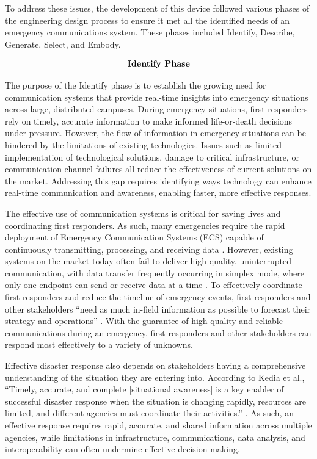 \documentclass[english,12pt,a4paper,titlepage]{article}
\begin{document}
	To address these issues, the development of this device followed various phases of the engineering design process to ensure it met all the identified needs of an emergency communications system. These phases included Identify, Describe, Generate, Select, and Embody.
	
	\[
	\begin{array}{cc}
		\mbox{\bfseries{Identify Phase}}
		\label{Identify Phase}
	\end{array}
	\]
	
	The purpose of the Identify phase is to establish the growing need for communication systems that provide real-time insights into emergency situations across large, distributed campuses. During emergency situations, first responders rely on timely, accurate information to make informed life‑or‑death decisions under pressure. However, the flow of information in emergency situations can be hindered by the limitations of existing technologies. Issues such as limited implementation of technological solutions, damage to critical infrastructure, or communication channel failures all reduce the effectiveness of current solutions on the market. Addressing this gap requires identifying ways technology can enhance real-time communication and awareness, enabling faster, more effective responses.
	
	The effective use of communication systems is critical for saving lives and coordinating first responders. As such, many emergencies require the rapid deployment of Emergency Communication Systems (ECS) capable of continuously transmitting, processing, and receiving data \autocite{Navarro}. However, existing systems on the market today often fail to deliver high-quality, uninterrupted communication, with data transfer frequently occurring in simplex mode, where only one endpoint can send or receive data at a time \autocite{Navarro}. To effectively coordinate first responders and reduce the timeline of emergency events, first responders and other stakeholders “need as much in-field information as possible to forecast their strategy and operations” \autocite{Navarro}. With the guarantee of high-quality and reliable communications during an emergency, first responders and other stakeholders can respond most effectively to a variety of unknowns.
	
	Effective disaster response also depends on stakeholders having a comprehensive understanding of the situation they are entering into. According to Kedia et al., “Timely, accurate, and complete [situational awareness] is a key enabler of successful disaster response when the situation is changing rapidly, resources are limited, and different agencies must coordinate their activities.” \autocite{Kedia2022}. As such, an effective response requires rapid, accurate, and shared information across multiple agencies, while limitations in infrastructure, communications, data analysis, and interoperability can often undermine effective decision-making.
	
\end{document}
